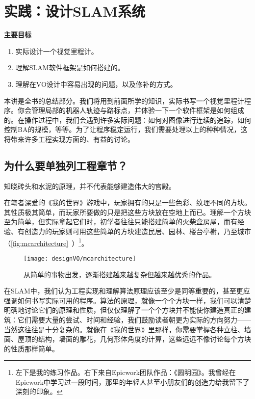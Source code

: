 \chapter{实践：设计SLAM系统}
\begin{mdframed}  
	\textbf{主要目标}
	\begin{enumerate}[labelindent=0em,leftmargin=1.5em]
		\item 实际设计一个视觉里程计。
		\item 理解SLAM软件框架是如何搭建的。
		\item 理解在VO设计中容易出现的问题，以及修补的方式。
	\end{enumerate}
\end{mdframed}

本讲是全书的总结部分。我们将用到前面所学的知识，实际书写一个视觉里程计程序。你会管理局部的机器人轨迹与路标点，并体验一下一个软件框架是如何组成的。在操作过程中，我们会遇到许多实际问题：如何对图像进行连续的追踪，如何控制BA的规模，等等。为了让程序稳定运行，我们需要处理以上的种种情况，这将带来许多工程实现方面的、有益的讨论。

\newpage 
\section{为什么要单独列工程章节？}
知晓砖头和水泥的原理，并不代表能够建造伟大的宫殿。

在笔者深爱的《我的世界》游戏中，玩家拥有的只是一些色彩、纹理不同的方块。其性质极其简单，而玩家所要做的只是把这些方块放在空地上而已。理解一个方块至为简单，但实际拿起它们时，初学者往往只能搭建简单的火柴盒房屋，而有经验、有创造力的玩家则可用这些简单的方块建造民居、园林、楼台亭榭，乃至城市（\autoref{fig:mcarchitecture}~）\footnote{左下是我的练习作品。右下来自Epicwork团队作品：《圆明园》。我曾经在Epicwork中学习过一段时间，那里的年轻人甚至小朋友们的创造力给我留下了深刻的印象。}。

\begin{figure}[!htp]
	\centering    
	\texttt{[image: designVO/mcarchitecture]}\\
	\caption{从简单的事物出发，逐渐搭建越来越复杂但越来越优秀的作品。}
	\label{fig:mcarchitecture}
\end{figure}

在SLAM中，我们认为工程实现和理解算法原理应该至少是同等重要的，甚至更应强调如何书写实际可用的程序。算法的原理，就像一个个方块一样，我们可以清楚明确地讨论它们的原理和性质，但仅仅理解了一个个方块并不能使你建造真正的建筑：它们需要大量的尝试、时间和经验，我们鼓励读者朝更为实际的方向努力——当然这往往是十分复杂的。就像在《我的世界》里那样，你需要掌握各种立柱、墙面、屋顶的结构，墙面的雕花，几何形体角度的计算，这些远远不像讨论每个方块的性质那样简单。

